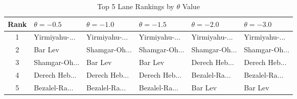 \begin{table}[H]
\centering
\caption{Top 5 Lane Rankings by $\theta$ Value}
\label{tab:sensitivity_theta}
\begin{tabular}{@{}clllll@{}}
\toprule
\textbf{Rank} & $\theta=-0.5$ & $\theta=-1.0$ & $\theta=-1.5$ & $\theta=-2.0$ & $\theta=-3.0$ \\
\midrule
1 & Yirmiyahu-... & Yirmiyahu-... & Yirmiyahu-... & Yirmiyahu-... & Yirmiyahu-... \\
2 & Bar Lev & Shamgar-Oh... & Shamgar-Oh... & Shamgar-Oh... & Shamgar-Oh... \\
3 & Shamgar-Oh... & Bar Lev & Bar Lev & Derech Heb... & Derech Heb... \\
4 & Derech Heb... & Derech Heb... & Derech Heb... & Bezalel-Ra... & Bezalel-Ra... \\
5 & Bezalel-Ra... & Bezalel-Ra... & Bezalel-Ra... & Bar Lev & Bar Lev \\
\bottomrule
\end{tabular}
\end{table}
